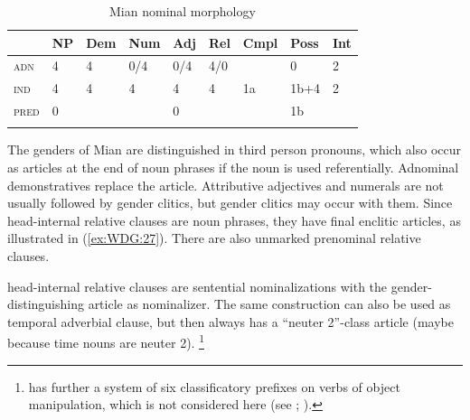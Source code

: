 \documentclass[output=collectionpaper]{langsci/langscibook}
\begin{document}
\begin{table}
\caption{Mian nominal morphology}
\begin{tabular}{>{\scshape}l*{8}{l}}
\lsptoprule
&	NP	&	Dem	&	Num	&	Adj	&	Rel	&	Cmpl	&	Poss	&	Int	\\
\midrule
adn	&	4	&	4	&	0/4	&	0/4	&	4/0	&		&	0	&	2	\\
ind	&	4	&	4	&	4	&	4	&	4	&	1a	&	1b+4	&	2	\\
pred	&	0	&		&		&	0	&		&		&	1b	&		\\
\lspbottomrule
\end{tabular}
\label{tab:WDG:8}
\end{table}



The genders of Mian are distinguished in third person pronouns, which also occur as articles at the end of noun phrases if the noun is used referentially. Adnominal demonstratives replace the article. Attributive adjectives and numerals are not usually followed by gender clitics, but gender clitics may occur with them. Since head-internal relative clauses are noun phrases, they have final enclitic articles, as illustrated in (\ref{ex:WDG:27}). There are also unmarked prenominal relative clauses.

%

 head-internal relative clauses are sentential nominalizations with the gender-distinguishing article as nominalizer. The same construction can also be used as temporal adverbial clause, but then always has a ``neuter 2''-class article (maybe because time nouns are neuter 2).%
\footnote{%
 has further a system of six classificatory prefixes on verbs of object manipulation, which is not considered here (see \citealt[459]{Fedden2010}; \citealt[185]{Fedden2011}).
} %
\end{document}
